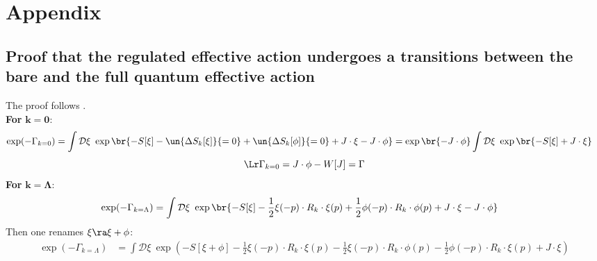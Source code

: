 \appendix
\section{Appendix}

    \subsection{Proof that the regulated effective action
    undergoes a transitions between the bare and the full quantum effective action}
    The proof follows \cite{mariomitter}.\\
\textbf{For} \( \mathbf{k=0} \):
\begin{equation*}
\begin{split}
\exp(-\Gamma_{k=0}) &= \int \mathcal{D}\xi ~\exp\br{ -S[\xi] - \un{\Delta S_k[\xi]}{=0} +\un{\Delta S_k[\phi]}{=0}   + J\cdot \xi - J\cdot \phi}
= \exp\br{ - J\cdot \phi} \int \mathcal{D}\xi ~\exp\br{ -S[\xi] + J\cdot \xi}
\end{split}
\end{equation*}
\begin{equation*}
\Lr \Gamma_{k=0} = J\cdot \phi - W[J] = \Gamma
\end{equation*}
\textbf{For }\( \mathbf{k=\Lambda }\):
\begin{equation*}
\begin{split}
\exp(-\Gamma_{k=\Lambda}) %
&=  \int \mathcal{D}\xi ~\exp\br{ -S[\xi] - \frac{1}{2}\xi(-p) \cdot R_k  \cdot \xi(p) + \frac{1}{2}\phi(-p) \cdot R_k  \cdot \phi(p)   + J\cdot \xi - J\cdot \phi}
\end{split}
\end{equation*}
Then one renames \( \xi \ra \xi + \phi \):
\begin{equation*}
\begin{split}
\exp(-\Gamma_{k=\Lambda}) %
&= \int \mathcal{D}\xi ~\exp\left( -S[\xi+\phi] - \frac{1}{2} \xi(-p)\cdot R_k\cdot \xi(p)-\frac{1}{2} \xi(-p) \cdot R_k  \cdot \phi(p) -\frac{1}{2} \phi(-p) \cdot R_k  \cdot \xi(p)    + J\cdot \xi \right)
\end{split}
\end{equation*}
